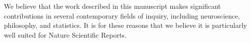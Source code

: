 \documentclass[10pt]{letter}
\begin{document}
\begin{letter}{	%
}
% 
% 


We believe that the work described in this manuscript makes significant contributions in several contemporary fields of inquiry, including neuroscience, philosophy, and statistics.  It is for these reasons that we believe it is particularly well suited for Nature Scientific Reports.  


\end{letter}
\end{document}
